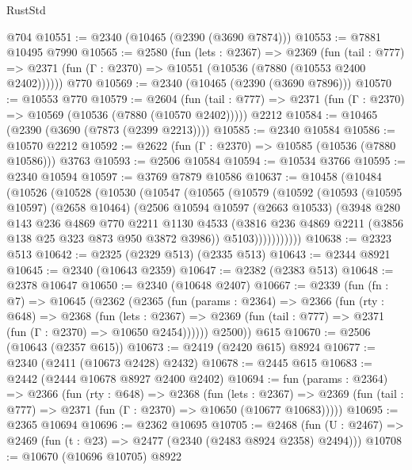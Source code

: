 \begin{lexlean}{RustStd}
\begin{coremodule}
    @704
@10551 := @2340 (@10465 (@2390 (@3690 @7874)))
@10553 := @7881 @10495 @7990
@10565 := @2580
    (fun (lets : @2367) =>
    @2369
      (fun (tail : @777) =>
      @2371 (fun (Γ : @2370) => @10551 (@10536 (@7880 (@10553 @2400 @2402))))))
    @770
@10569 := @2340 (@10465 (@2390 (@3690 @7896)))
@10570 := @10553 @770
@10579 := @2604
    (fun (tail : @777) => @2371 (fun (Γ : @2370) => @10569 (@10536 (@7880 (@10570 @2402)))))
    @2212
@10584 := @10465 (@2390 (@3690 (@7873 (@2399 @2213))))
@10585 := @2340 @10584
@10586 := @10570 @2212
@10592 := @2622 (fun (Γ : @2370) => @10585 (@10536 (@7880 @10586))) @3763
@10593 := @2506 @10584
@10594 := @10534 @3766
@10595 := @2340 @10594
@10597 := @3769 @7879 @10586
@10637 := @10458
    (@10484
      (@10526
        (@10528
          (@10530
            (@10547
              (@10565
                (@10579
                  (@10592
                    (@10593
                      (@10595 @10597)
                      (@2658 @10464)
                      (@2506
                        @10594
                        @10597
                        (@2663 @10533)
                        (@3948
                          @280
                          @143
                          @236
                          @4869
                          @770
                          @2211
                          @1130
                          @4533
                          (@3816 @236 @4869 @2211 (@3856 @138 @25 @323 @873 @950 @3872 @3986))
                          @5103)))))))))))
@10638 := @2323 @513
@10642 := @2325 (@2329 @513) (@2335 @513)
@10643 := @2344 @8921
@10645 := @2340 (@10643 @2359)
@10647 := @2382 (@2383 @513)
@10648 := @2378 @10647
@10650 := @2340 (@10648 @2407)
@10667 := @2339
    (fun (fn : @7) =>
    @10645
      (@2362
        (@2365
          (fun (params : @2364) =>
          @2366
            (fun (rty : @648) =>
            @2368
              (fun (lets : @2367) =>
              @2369 (fun (tail : @777) => @2371 (fun (Γ : @2370) => @10650 @2454))))))
        @2500))
    @615
@10670 := @2506 (@10643 (@2357 @615))
@10673 := @2419 (@2420 @615) @8924
@10677 := @2340 (@2411 (@10673 @2428) @2432)
@10678 := @2445 @615
@10683 := @2442 (@2444 @10678 @8927 @2400 @2402)
@10694 := fun (params : @2364) =>
  @2366
    (fun (rty : @648) =>
    @2368
      (fun (lets : @2367) =>
      @2369 (fun (tail : @777) => @2371 (fun (Γ : @2370) => @10650 (@10677 @10683)))))
@10695 := @2365 @10694
@10696 := @2362 @10695
@10705 := @2468
    (fun (U : @2467) => @2469 (fun (t : @23) => @2477 (@2340 (@2483 @8924 @2358) @2494)))
@10708 := @10670 (@10696 @10705) @8922

\end{coremodule}
\end{lexlean}
